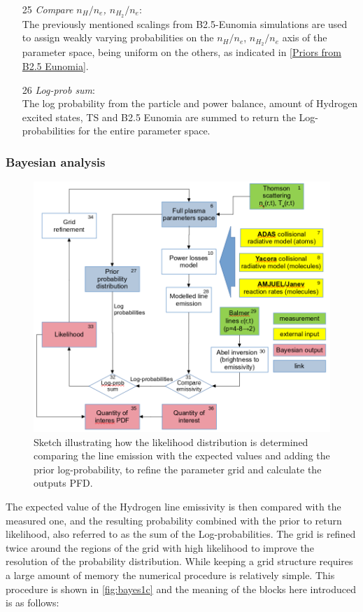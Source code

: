 \begin{enumerate}
    \item[25] \emph{Compare $n_H/n_e$, $n_{H_2}/n_e$}: \\The previously mentioned scalings from B2.5-Eunomia simulations are used to assign weakly varying probabilities on the $n_H/n_e$, $n_{H_2}/n_e$ axis of the parameter space, being uniform on the others, as indicated in \autoref{Priors from B2.5 Eunomia}.
    \item[26] \emph{Log-prob sum}: \\The log probability from the particle and power balance, amount of Hydrogen excited states, TS and B2.5 Eunomia are summed to return the Log-probabilities for the entire parameter space.
\end{enumerate}

\subsubsection{Bayesian analysis}\label{Bayesian analysis}

\begin{figure}
	\centering
	\includegraphics[scale=0.29,trim={0 0 0 0},clip]{Chapters/chapter3/figs/bayesian_steps13.png}
	\caption{Sketch illustrating how the likelihood distribution is determined comparing the line emission with the expected values and adding the prior log-probability, to refine the parameter grid and calculate the outputs PFD.}
	\label{fig:bayes1c}
\end{figure}


The expected value of the Hydrogen line emissivity is then compared with the measured one, and the resulting probability combined with the prior to return likelihood, also referred to as the sum of the Log-probabilities. The grid is refined twice around the regions of the grid with high likelihood to improve the resolution of the probability distribution. While keeping a grid structure requires a large amount of memory the numerical procedure is relatively simple.
This procedure is shown in \autoref{fig:bayes1c} and the meaning of the blocks here introduced is as follows:


